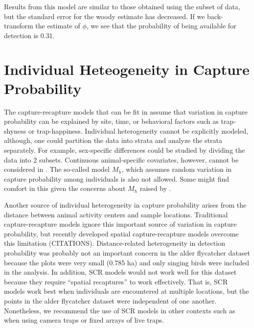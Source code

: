 \documentclass[a4paper]{article}
\begin{document}
Results from this model are similar to those obtained using the subset
of data, but the standard error for the woody estimate has
decreased. If we back-transform the estimate of $\phi$, we  see that
the probability of being available for detection is 0.31.


\section*{Individual Heteogeneity in Capture Probability}

The capture-recapture models that can be fit in  assume
that variation in capture probability can be
explained by site, time, or behavioral factors such as trap-shyness or
trap-happiness. Individual
heterogeneity cannot be explicitly modeled, although, one could
partition the data into strata and analyze the strata separately. For
example, sex-specific
differences could be studied by dividing the data into 2 subsets.
Continuous animal-specific covariates, however, cannot be
considered in . The so-called model $M_h$, which assumes
random variation in capture probability among individuals is also not
allowed. Some might find comfort in this given the concerns about
$M_h$ raised by \citet{link:2003}.

Another source of individual heterogeneity in capture probability
arises from the distance between animal activity centers and
sample locations. Traditional capture-recapture models ignore this
important source of variation in capture probability, but
recently developed spatial capture-recapture models overcome this
limitation (CITATIONS). Distance-related heterogeneity in detection
probability was probably not an important concern in the alder
flycatcher dataset because the plots were very small (0.785 ha) and
only singing birds were included in the analysis. In addition, SCR
models would not work well for this dataset because they
require ``spatial recaptures'' to work effectively. That is,
SCR models work best when individuals are encountered at multiple
locations, but the points in the alder flycatcher dataset were
independent of one another. Nonetheless, we recommend the use of SCR
models in other contexts such as when using camera traps or fixed
arrays of live traps.


\end{document}
